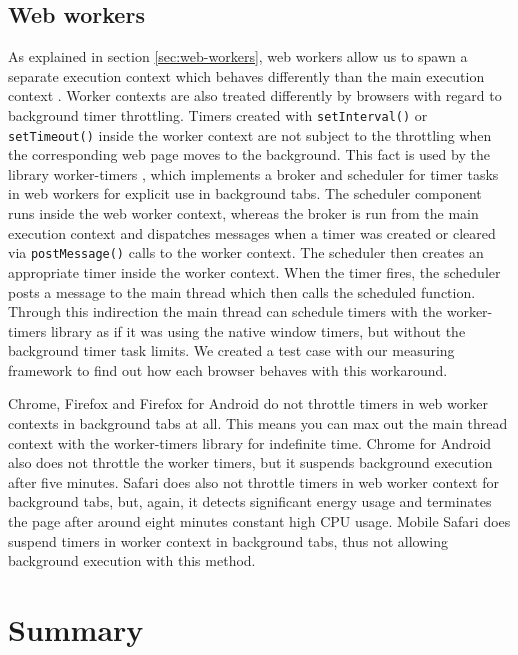 \documentclass[
	ruledheaders=section,%
	class=report,%
	thesis={type=bachelor},%
	accentcolor=9c,%
	custommargins=true,%
	marginpar=false,%
	parskip=half-,%
	fontsize=11pt,%
]{tudapub}
\begin{document}
  
  \subsection{Web workers}

  As explained in section \ref{sec:web-workers}, web workers allow us to spawn a separate execution context which behaves differently than the main execution context \cite{mdn-worker}. Worker contexts are also treated differently by browsers with regard to background timer throttling. Timers created with \texttt{setInterval()} or \texttt{setTimeout()} inside the worker context are not subject to the throttling when the corresponding web page moves to the background. This fact is used by the library worker-timers \cite{worker-timers}, which implements a broker and scheduler for timer tasks in web workers for explicit use in background tabs. The scheduler component runs inside the web worker context, whereas the broker is run from the main execution context and dispatches messages when a timer was created or cleared via \texttt{postMessage()} calls to the worker context. The scheduler then creates an appropriate timer inside the worker context. When the timer fires, the scheduler posts a message to the main thread which then calls the scheduled function. Through this indirection the main thread can schedule timers with the worker-timers library as if it was using the native window timers, but without the background timer task limits. We created a test case with our measuring framework to find out how each browser behaves with this workaround.
  
  Chrome, Firefox and Firefox for Android do not throttle timers in web worker contexts in background tabs at all. This means you can max out the main thread context with the worker-timers library for indefinite time. Chrome for Android also does not throttle the worker timers, but it suspends background execution after five minutes. Safari does also not throttle timers in web worker context for background tabs, but, again, it detects significant energy usage and terminates the page after around eight minutes constant high CPU usage. Mobile Safari does suspend timers in worker context in background tabs, thus not allowing background execution with this method.
  
  
  \section{Summary}
\end{document}
